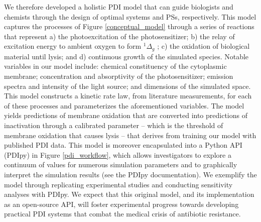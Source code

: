 We therefore developed a holistic PDI model that can guide biologists and chemists through the design of optimal systems and PSs, respectively. This model captures the processes of Figure \ref{conceptual_model} through a series of reactions that represent a) the photoexcitation of the photosensitizer; b) the relay of excitation energy to ambient oxygen to form $^1\Delta_g$ ; c) the oxidation of biological material until lysis; and d) continuous growth of the simulated species. Notable variables in our model include: chemical constituency of the cytoplasmic membrane; concentration and absorptivity of the photosensitizer; emission spectra and intensity of the light source; and dimensions of the simulated space. This model constructs a kinetic rate law, from literature measurements, for each of these processes and parameterizes the aforementioned variables. The model yields predictions of membrane oxidation that are converted into predictions of inactivation through a calibrated parameter -- which is the threshold of membrane oxidation that causes lysis -- that derives from training our model with published PDI data. This model is moreover encapsulated into a Python API (PDIpy) in Figure \ref{pdi_workflow}, which allows investigators to explore a continuum of values for numerous simulation parameters and to graphically interpret the simulation results (see the PDIpy documentation). We exemplify the model through replicating experimental studies and conducting sensitivity analyses with PDIpy. We expect that this original model, and its implementation as an open-source API, will foster experimental progress towards developing practical PDI systems that combat the medical crisis of antibiotic resistance. 

